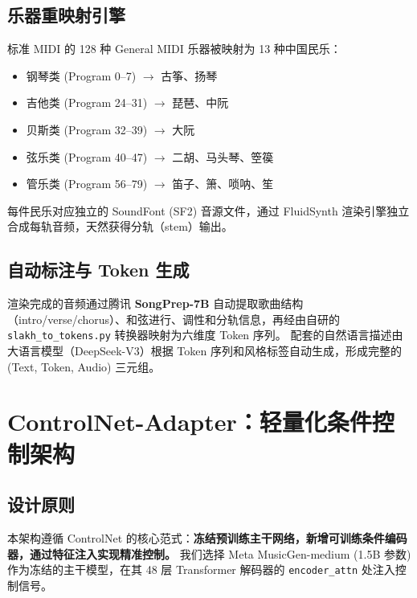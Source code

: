 \documentclass[12pt,a4paper]{article}
\begin{document}
\subsection{乐器重映射引擎}

标准 MIDI 的 128 种 General MIDI 乐器被映射为 13 种中国民乐：

\begin{itemize}
\item 钢琴类 (Program 0--7) $\rightarrow$ 古筝、扬琴
\item 吉他类 (Program 24--31) $\rightarrow$ 琵琶、中阮
\item 贝斯类 (Program 32--39) $\rightarrow$ 大阮
\item 弦乐类 (Program 40--47) $\rightarrow$ 二胡、马头琴、箜篌
\item 管乐类 (Program 56--79) $\rightarrow$ 笛子、箫、唢呐、笙
\end{itemize}

每件民乐对应独立的 SoundFont (SF2) 音源文件，通过 FluidSynth 渲染引擎独立合成每轨音频，天然获得分轨（stem）输出。

\subsection{自动标注与 Token 生成}

渲染完成的音频通过腾讯 \textbf{SongPrep-7B}\cite{songprep} 自动提取歌曲结构（intro/verse/chorus）、和弦进行、调性和分轨信息，再经由自研的 \texttt{slakh\_to\_tokens.py} 转换器映射为六维度 Token 序列。
配套的自然语言描述由大语言模型（DeepSeek-V3）根据 Token 序列和风格标签自动生成，形成完整的 (Text, Token, Audio) 三元组。

\section{ControlNet-Adapter：轻量化条件控制架构}

\subsection{设计原则}

本架构遵循 ControlNet\cite{controlnet} 的核心范式：\textbf{冻结预训练主干网络，新增可训练条件编码器，通过特征注入实现精准控制。}
我们选择 Meta MusicGen-medium\cite{musicgen} (1.5B 参数) 作为冻结的主干模型，在其 48 层 Transformer 解码器的 \texttt{encoder\_attn} 处注入控制信号。
\end{document}
